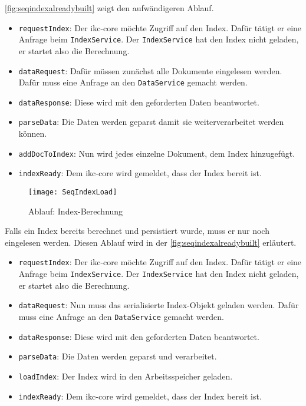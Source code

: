 \autoref{fig:seqindexalreadybuilt} zeigt den aufwändigeren Ablauf. 
\begin{itemize}
    \item \texttt{requestIndex}: Der \gls{ikc-core} möchte Zugriff auf den Index. Dafür tätigt er eine Anfrage beim \texttt{IndexService}. Der \texttt{IndexService} hat den Index nicht geladen, er startet also die Berechnung.
    \item \texttt{dataRequest}: Dafür müssen zunächst alle Dokumente eingelesen werden. Dafür muss eine Anfrage an den \texttt{DataService} gemacht werden.
    \item \texttt{dataResponse}: Diese wird mit den geforderten Daten beantwortet.
    \item \texttt{parseData}: Die Daten werden geparst damit sie weiterverarbeitet werden können.
    \item \texttt{addDocToIndex}: Nun wird jedes einzelne Dokument, dem Index hinzugefügt.
    \item \texttt{indexReady}: Dem \gls{ikc-core} wird gemeldet, dass der Index bereit ist.
\end{itemize}

    \begin{figure}[H]
    \centering
    \texttt{[image: SeqIndexLoad]}
    \caption{Ablauf: Index-Berechnung}
    \label{fig:seqindexload}
    \end{figure}

Falls ein Index bereits berechnet und persistiert wurde, muss er nur noch eingelesen werden. Diesen Ablauf wird in der \autoref{fig:seqindexalreadybuilt} erläutert. 
\begin{itemize}
    \item \texttt{requestIndex}: Der \gls{ikc-core} möchte Zugriff auf den Index. Dafür tätigt er eine Anfrage beim \texttt{IndexService}. Der \texttt{IndexService} hat den Index nicht geladen, er startet also die Berechnung.
    \item \texttt{dataRequest}: Nun muss das serialisierte Index-Objekt geladen werden. Dafür muss eine Anfrage an den \texttt{DataService} gemacht werden.
    \item \texttt{dataResponse}: Diese wird mit den geforderten Daten beantwortet.
    \item \texttt{parseData}: Die Daten werden geparst und verarbeitet.
    \item \texttt{loadIndex}: Der Index wird in den Arbeitsspeicher geladen.
    \item \texttt{indexReady}: Dem \gls{ikc-core} wird gemeldet, dass der Index bereit ist.
\end{itemize}

